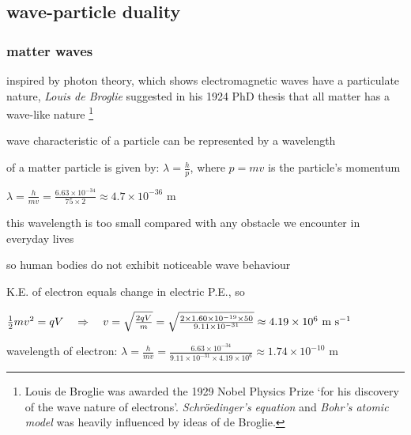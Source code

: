 \newpage

\subsection{wave-particle duality}

\subsubsection{matter waves}

inspired by photon theory, which shows electromagnetic waves have a particulate nature, \emph{Louis de Broglie} suggested in his 1924 PhD thesis that all matter has a wave-like nature
\footnote{Louis de Broglie was awarded the 1929 Nobel Physics Prize `for his discovery of the wave nature of electrons'. \emph{Schr\"oedinger's equation} and \emph{Bohr's atomic model} was heavily influenced by ideas of de Broglie.}

wave characteristic of a particle can be represented by a wavelength

\begin{ilight}
	 of a matter particle is given by: $\boxed{\lambda = \frac{h}{p}}$, where $p=mv$ is the particle's momentum
\end{ilight}


\sol $\lambda = \frac{h}{mv} = \frac{6.63\times10^{-34}}{75\times 2} \approx 4.7\times 10^{-36} \text{ m}$

this wavelength is too small compared with any obstacle we encounter in everyday lives

so human bodies do not exhibit noticeable wave behaviour \eoe


K.E. of electron equals change in electric P.E., so

{
	
	\centering
	
	$\frac{1}{2}mv^2 = qV \quad \Rightarrow \quad v = \sqrt{\frac{2qV}{m}} = \sqrt{\frac{2\times1.60\times 10^{-19} \times 50}{9.11\times10^{-31}}} \approx 4.19\times10^6 \text{ m s$^{-1}$}$
	
}

\eqyskip

wavelength of electron: $\lambda = \frac{h}{mv} = \frac{6.63\times10^{-34}}{9.11\times10^{-31}\times 4.19\times10^6} \approx 1.74 \times10^{-10} \text{ m}$


